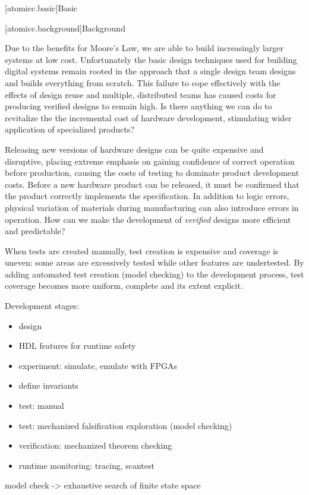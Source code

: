 [atomicc.basic]{Basic}

[atomicc.background]{Background}

Due to the benefits for Moore's Law, we are able to build increasingly
larger systems at low cost.  Unfortunately the basic design techniques
used for building digital systems remain rooted in the approach that
a single design team designs and builds everything from scratch.
This failure to cope effectively with the effects of design reuse
and multiple, distributed teams has caused costs for producing
verified designs to remain high.
Is there anything we can do to revitalize the the incremental cost of
hardware development, stimulating wider application of specialized products?

Releasing new versions of hardware designs
can be quite expensive and disruptive,
placing extreme emphasis on gaining confidence of correct operation before
production, causing the costs of testing to
dominate product development costs.
Before a new hardware product can be released, 
it must be confirmed that the product correctly implements the specification.
In addition to logic errors, physical variation of materials during manufacturing
can also introduce errors in operation.
How can we make the development of 
\textit{verified} designs more efficient and predictable?

When tests are created manually, test creation is expensive and
coverage is uneven: some areas are
excessively tested while other features are undertested.
By adding automated test creation (model checking) to the development process,
test coverage becomes more uniform, complete and its extent explicit.

Development stages:
\begin{itemize}
\item design
\item HDL features for runtime safety
\item experiment: simulate, emulate with FPGAs
\item define invariants
\item test: manual
\item test: mechanized falsification exploration (model checking)
\item verification: mechanized theorem checking
\item runtime monitoring: tracing, scantest
\end{itemize}

model check -> exhaustive search of finite state space

